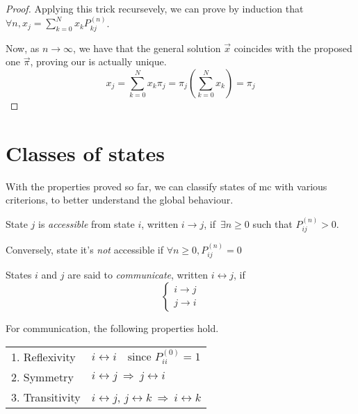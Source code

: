 \begin{proof}
	Applying this trick recursevely, we can prove by induction that  $\forall n, x_j = \sum_{k=0}^N x_k P_{kj}^{(n)}$.

	Now, as $n \to \infty$, we have that the general solution $\vec{x}$ coincides with the proposed one $\vec{\pi}$, proving our is actually unique.
	\begin{equation}
		x_j = \sum_{k=0}^N x_k \pi_j
			= \pi_j \left( \sum_{k=0}^N x_k \right)
			= \pi_j
	\end{equation}
\end{proof}

\section{Classes of states}
	With the properties proved so far, we can classify states of \gls{mc} with various criterions, to better understand the global behaviour.

	\begin{definition}
		State $j$ is \emph{accessible} from state $i$, written $i \rightarrow j$, if\, $\exists n \geq 0$ such that $P_{ij}^{(n)} > 0$.

		Conversely, state it's \emph{not} accessible if $\forall n \ge 0, P_{ij}^{(n)}=0$
	\end{definition}

	\begin{definition}
		States $i$ and $j$ are said to \emph{communicate}, written $ i \leftrightarrow j$, if
		\begin{equation}
			\begin{cases}
				i \rightarrow j \\
				j \rightarrow i
			\end{cases}
		\end{equation}
	\end{definition}

	For communication, the following properties hold.

	\vspace{1em}
	\begin{tabular}{l l}
		1. Reflexivity & $i \leftrightarrow i \quad\text{since } P_{ii}^{(0)}=1$ \\
		2. Symmetry & $i \leftrightarrow j ~ \Rightarrow ~ j \leftrightarrow i$ \\
		3. Transitivity & $i \leftrightarrow j$, $j \leftrightarrow k ~ \Rightarrow~  i \leftrightarrow k$\\
	\end{tabular}
	\vspace{1em}

